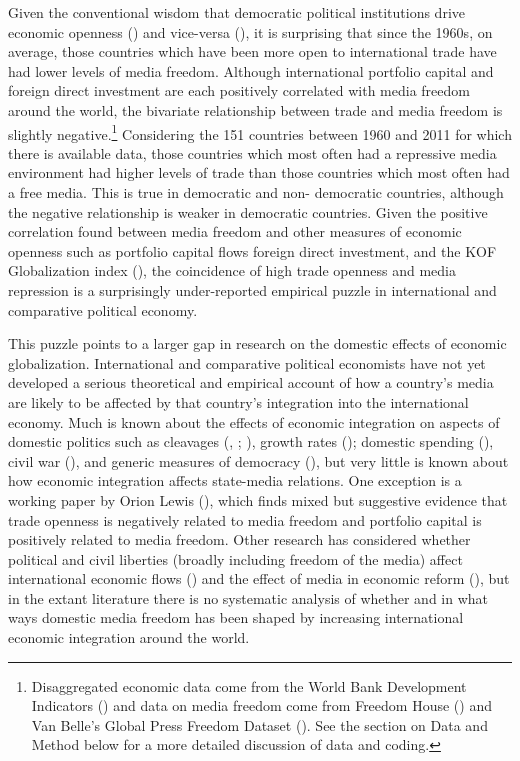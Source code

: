 \documentclass[12pt]{report}
\begin{document}
Given the conventional wisdom that democratic political institutions drive economic openness
(\citealt{Milner:2005ci}) and vice-versa (\citealt{EICHENGREEN:2008gg}), it is surprising that since
the 1960s, on average, those countries which have been more open to international trade have had
lower levels of media freedom. Although international portfolio capital and foreign direct
investment are each positively correlated with media freedom around the world, the bivariate
relationship between trade and media freedom is slightly negative.\footnote{Disaggregated economic
data come from the World Bank Development Indicators (\citealt{WorldDevelopmentIn:2012wl}) and data
on media freedom come from Freedom House () and Van Belle's Global Press Freedom Dataset
(\citealt{van2000press}). See the section on Data and Method below for a more detailed discussion of
data and coding.} Considering the 151 countries between 1960 and 2011 for which there is available
data, those countries which most often had a repressive media environment had higher levels of trade
than those countries which most often had a free media. This is true in democratic and non-
democratic countries, although the negative relationship is weaker in democratic countries. Given
the positive correlation found between media freedom and other measures of economic openness such as
portfolio capital flows foreign direct investment, and the KOF Globalization index
(\citealt{dreher2008measuring}), the coincidence of high trade openness and media repression is a
surprisingly under-reported empirical puzzle in international and comparative political economy.

This puzzle points to a larger gap in research on the domestic effects of economic globalization.
International and comparative political economists have not yet developed a serious theoretical and
empirical account of how a country's media are likely to be affected by that country's integration
into the international economy. Much is known about the effects of economic integration on aspects
of domestic politics such as cleavages (\citealt{Rogowski:1987ip}, \citeyear{Rogowski:1989wm};
\citealt{hiscox2002international}), growth rates (\citealt{Rodriguez:2001uw}); domestic spending
(\citealt{Rodrik:1998te,Burgoon:2001dp}), civil war (\citealt{Barbieri:2005uk,Bussmann:2007vx}), and
generic measures of democracy (\citealt{EICHENGREEN:2008gg,Li:2003vj}), but very little is known
about how economic integration affects state-media relations. One exception is a working paper by
Orion Lewis (\citeyear{Anonymous:lbhrCJXF}), which finds mixed but suggestive evidence that trade
openness is negatively related to media freedom and portfolio capital is positively related to media
freedom. Other research has considered whether political and civil liberties (broadly including
freedom of the media) affect international economic flows (\cite{Adam:2007gn}) and the effect of
media in economic reform (\citealt{Coyne:2004bq,Islam:2002uc}), but in the extant literature there
is no systematic analysis of whether and in what ways domestic media freedom has been shaped by
increasing international economic integration around the world.
\end{document}
